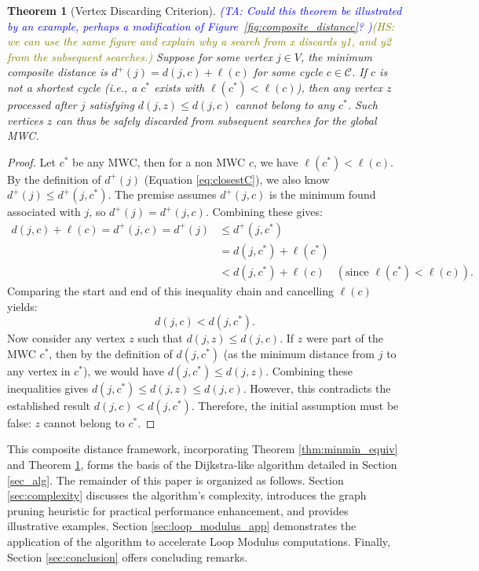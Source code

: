 \documentclass{article}
\newtheorem{theorem}{Theorem}
\newcommand{\ta}[1]{\textcolor{blue}{\textit{(TA: {#1})}}}
\newcommand{\hs}[1]{\textcolor{olive}{\textit{(HS: {#1})}}}
\begin{document}
\begin{theorem}[Vertex Discarding Criterion]\label{thm:exclude_vertices} %
\ta{Could this theorem be illustrated by an example, perhaps a modification of Figure~\ref{fig:composite_distance}? }\hs{we can use the same figure and explain why a search from x discards y1, and y2 from the subsequent searches.}
Suppose for some vertex $j \in V$, the minimum composite distance is $d^+(j) = d(j,c) + \ell(c)$ for some cycle $c \in \mathscr{C}$. If $c$ is not a shortest cycle (i.e., a $c^*$ exists with $\ell(c^*) < \ell(c)$), then any vertex $z$ processed after $j$ satisfying $d(j,z) \le d(j,c)$ cannot belong to any $c^*$. Such vertices $z$ can thus be safely discarded from subsequent searches for the global MWC.
\end{theorem}
\begin{proof}
	Let $c^*$ be any MWC, then for a non MWC $c$, we have $\ell(c^*) < \ell(c)$. By the definition of $d^+(j)$ (Equation \ref{eq:closestC}), we also know $d^+(j) \le d^+(j,c^*)$. The premise assumes $d^+(j,c)$ is the minimum found associated with $j$, so $d^+(j) = d^+(j,c)$. Combining these gives:
	\begin{align*}
	d(j,c) + \ell(c) = d^+(j,c) = d^+(j) &\le d^+(j,c^*) \\
	&= d(j,c^*) + \ell(c^*) \\
	&< d(j,c^*) + \ell(c) \quad (\text{since } \ell(c^*) < \ell(c)).
	\end{align*}
	Comparing the start and end of this inequality chain and cancelling $\ell(c)$ yields:
	$$
	d(j,c) < d(j,c^*).
	$$
	Now consider any vertex $z$ such that $d(j,z) \le d(j,c)$. If $z$ were part of the MWC $c^*$, then by the definition of $d(j,c^*)$ (as the minimum distance from $j$ to any vertex in $c^*$), we would have $d(j,c^*) \le d(j,z)$. Combining these inequalities gives $d(j,c^*) \le d(j,z) \le d(j,c)$. However, this contradicts the established result $d(j,c) < d(j,c^*)$. Therefore, the initial assumption must be false: $z$ cannot belong to $c^*$.
\end{proof}
This composite distance framework, incorporating Theorem \ref{thm:minmin_equiv} and Theorem \ref{thm:exclude_vertices}, forms the basis of the Dijkstra-like algorithm detailed in Section \ref{sec_alg}.
The remainder of this paper is organized as follows. Section \ref{sec:complexity} discusses the algorithm's complexity, introduces the graph pruning heuristic for practical performance enhancement, and provides illustrative examples. Section \ref{sec:loop_modulus_app} demonstrates the application of the algorithm to accelerate Loop Modulus computations. Finally, Section \ref{sec:conclusion} offers concluding remarks.
\end{document}
